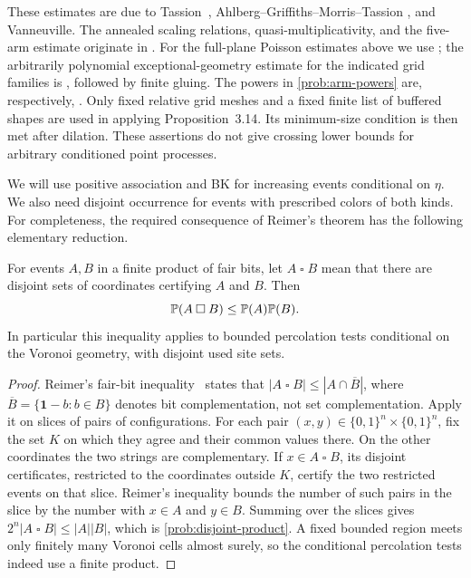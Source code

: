 These estimates are due to
Tassion~\cite{Tassion2016}, Ahlberg--Griffiths--Morris--Tassion
\cite{AGMT2016}, and Vanneuville. The annealed scaling relations,
quasi-multiplicativity, and the five-arm estimate originate in
\cite{Vanneuville2019}. For the full-plane Poisson estimates above we use
\cite[Theorems~1.2--1.4]{Vanneuville2025}; the arbitrarily
polynomial exceptional-geometry estimate for the indicated grid families
is \cite[Proposition~3.14]{Vanneuville2025}, followed by finite gluing.
The powers in \eqref{prob:arm-powers} are, respectively,
\cite[(3.1), Proposition~3.4(iii), and Proposition~6.2]{Vanneuville2025}.
Only fixed relative grid meshes and a fixed finite list of buffered shapes
are used in applying Proposition~3.14.  Its minimum-size condition is then
met after dilation.  These assertions do not give crossing lower bounds
for arbitrary conditioned point processes.

We will use positive association and BK for increasing events conditional
on $\eta$.  We also need disjoint occurrence for events with prescribed
colors of both kinds.  For completeness, the required consequence of
Reimer's theorem has the following elementary reduction.

\begin{lemma}\label{prob:reimer}
For events $A,B$ in a finite product of fair bits, let $A\mathbin\square B$
mean that there are disjoint sets of coordinates certifying $A$ and $B$.
Then
\begin{equation}\label{prob:disjoint-product}
 \mathbb P(A\mathbin\square B)\le\mathbb P(A)\mathbb P(B).
\end{equation}
In particular this inequality applies to bounded percolation tests
conditional on the Voronoi geometry, with disjoint used site sets.
\end{lemma}

\begin{proof}
Reimer's fair-bit inequality~\cite{Reimer2000} states that
$|A\mathbin\square B|\le |A\cap\overline B|$, where
$\overline B=\{\mathbf1-b:b\in B\}$ denotes bit complementation, not set
complementation.  Apply it on slices of pairs of configurations.
For each pair $(x,y)\in\{0,1\}^n\times\{0,1\}^n$, fix the set $K$ on
which they agree and their common values there.  On the other coordinates
the two strings are complementary.  If $x\in A\mathbin\square B$, its
disjoint certificates, restricted to the coordinates outside $K$, certify
the two restricted events on that slice.  Reimer's inequality bounds the
number of such pairs in the slice by the number with $x\in A$ and $y\in B$.
Summing over the slices gives
$2^n|A\mathbin\square B|\le |A||B|$, which is
\eqref{prob:disjoint-product}.  A fixed bounded region meets only finitely
many Voronoi cells almost surely, so the conditional percolation tests
indeed use a finite product.
\end{proof}

